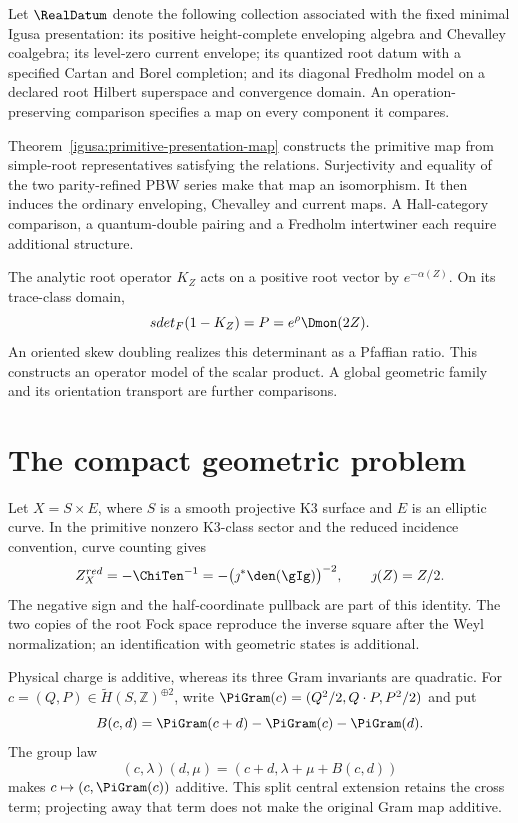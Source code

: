 \begin{definition}
\label{comp:def:root-constructions}
Let \(\RealDatum\) denote the following collection associated with
the fixed minimal Igusa presentation: its positive height-complete
enveloping algebra and Chevalley coalgebra; its level-zero current
envelope; its quantized root datum with a specified Cartan and Borel
completion; and its diagonal Fredholm model on a declared root
Hilbert superspace and convergence domain. An operation-preserving
comparison specifies a map on every component it compares.
\end{definition}

Theorem~\ref{igusa:primitive-presentation-map} constructs the
primitive map from simple-root representatives satisfying the
relations. Surjectivity and equality of the two parity-refined PBW
series make that map an isomorphism. It then induces the ordinary
enveloping, Chevalley and current maps. A Hall-category comparison,
a quantum-double pairing and a Fredholm intertwiner each require
additional structure.

The analytic root operator \(K_Z\) acts on a positive root vector
by \(e^{-\alpha(Z)}\). On its trace-class domain,
\[
 \operatorname{sdet}_F(1-K_Z)=P=e^{\rho}\Dmon(2Z).
\]
An oriented skew doubling realizes this determinant as a Pfaffian
ratio. This constructs an operator model of the scalar product.
A global geometric family and its orientation transport are further
comparisons.

\section{The compact geometric problem}

Let \(X=S\times E\), where \(S\) is a smooth projective K3
surface and \(E\) is an elliptic curve. In the primitive nonzero
K3-class sector and the reduced incidence convention, curve counting
gives
\[
 \mathcal Z^{\mathrm{red}}_{X}=-\ChiTen^{-1}
 =-\bigl(\jmath^*\den(\gIg)\bigr)^{-2},
 \qquad \jmath(Z)=Z/2.
\]
The negative sign and the half-coordinate pullback are part of this
identity. The two copies of the root Fock space reproduce the inverse
square after the Weyl normalization; an identification with geometric
states is additional.

Physical charge is additive, whereas its three Gram invariants are
quadratic. For $c=(Q,P)\in\widetilde H(S,\mathbb Z)^{\oplus2}$,
write $\PiGram(c)=(Q^2/2,Q\cdot P,P^2/2)$ and put
\[
 B(c,d)=\PiGram(c+d)-\PiGram(c)-\PiGram(d).
\]
The group law
\[
 (c,\lambda)(d,\mu)=(c+d,\lambda+\mu+B(c,d))
\]
makes \(c\mapsto(c,\PiGram(c))\) additive. This split central
extension retains the cross term; projecting away that term does not
make the original Gram map additive.


